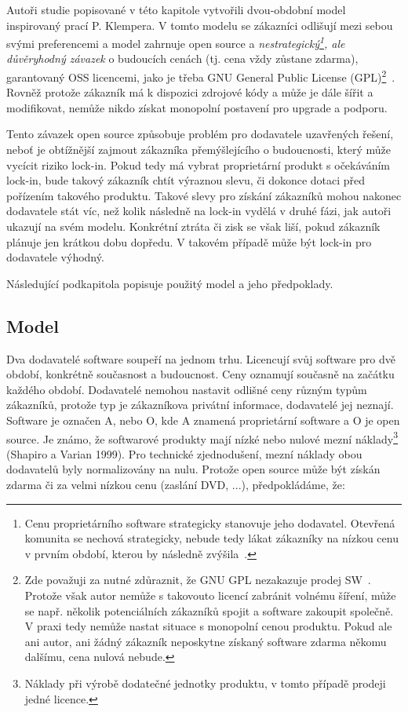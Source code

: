 \begin{multicols}{2}
	Autoři studie popisované v této kapitole vytvořili dvou-obdobní model inspirovaný prací P. Klempera. V tomto modelu se zákazníci odlišují mezi sebou svými preferencemi a model zahrnuje open source a {\em nestrategický\footnote{Cenu proprietárního software strategicky stanovuje jeho dodavatel. Otevřená komunita se nechová strategicky, nebude tedy lákat zákazníky na nízkou cenu v prvním období, kterou by následně zvýšila~\cite[str. 2]{lock-in-competition}.}, ale důvěryhodný závazek} o budoucích cenách (tj. cena vždy zůstane zdarma), garantovaný OSS licencemi, jako je třeba GNU General Public License (GPL)\footnote{Zde považuji za nutné zdůraznit, že GNU GPL nezakazuje prodej SW~\cite{selling-foss}. Protože však autor nemůže s takovouto licencí zabránit volnému šíření, může se např. několik potenciálních zákazníků spojit a software zakoupit společně. V praxi tedy nemůže nastat situace s monopolní cenou produktu. Pokud ale ani autor, ani žádný zákazník neposkytne získaný software zdarma někomu dalšímu, cena nulová nebude.}~\cite[str. 2]{lock-in-competition}. Rovněž protože zákazník má k dispozici zdrojové kódy a může je dále šířit a modifikovat, nemůže nikdo získat monopolní postavení pro upgrade a podporu.

	Tento závazek open source způsobuje problém pro dodavatele uzavřených řešení, neboť je obtížnější zajmout zákazníka přemýšlejícího o budoucnosti, který může vycícit riziko lock-in. Pokud tedy má vybrat proprietární produkt s očekáváním lock-in, bude takový zákazník chtít výraznou slevu, či dokonce dotaci před pořízením takového produktu. Takové slevy pro získání zákazníků mohou nakonec dodavatele stát víc, než kolik následně na lock-in vydělá v druhé fázi, jak autoři ukazují na svém modelu. Konkrétní ztráta či zisk se však liší, pokud zákazník plánuje jen krátkou dobu dopředu. V takovém případě může být lock-in pro dodavatele výhodný.

	Následující podkapitola popisuje použitý model a jeho předpoklady.

	\subsection*{Model}

	Dva dodavatelé software soupeří na jednom trhu. Licencují svůj software pro dvě období, konkrétně současnost a budoucnost. Ceny oznamují současně na začátku každého období. Dodavatelé nemohou nastavit odlišné ceny různým typům zákazníků, protože typ je zákazníkova privátní informace, dodavatelé jej neznají. Software je označen A, nebo O, kde A znamená proprietární software a O je open source. Je známo, že softwarové produkty mají nízké nebo nulové mezní náklady\footnote{Náklady při výrobě dodatečné jednotky produktu, v tomto případě prodeji jedné licence.} (Shapiro a Varian 1999). Pro technické zjednodušení, mezní náklady obou dodavatelů byly normalizovány na nulu. Protože open source může být získán zdarma či za velmi nízkou cenu (zaslání DVD, ...), předpokládáme, že:


\end{multicols}
